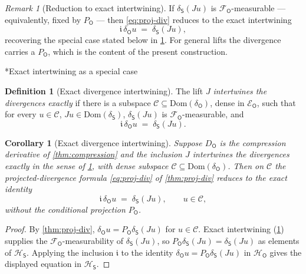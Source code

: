 \documentclass[11pt,reqno]{amsart}
\makeatletter
\renewcommand\subsection{\@startsection{subsection}{2}%
  \z@{.7\linespacing}{.5\linespacing}%
  {\normalfont\centering\scshape}}
\theoremstyle{plain}
\newtheorem{corollary}[theorem]{Corollary}
\theoremstyle{definition}
\newtheorem{definition}[theorem]{Definition}
\theoremstyle{remark}
\newtheorem{remark}[theorem]{Remark}
\newcommand{\Hilb}{\mathcal{H}}
\newcommand{\Dom}{\mathrm{Dom}}
\newcommand{\Energy}{\mathcal{E}}
\newcommand{\Source}{\mathsf{S}}
\newcommand{\Obs}{\mathsf{O}}
\renewcommand{\iota}{\mathfrak{i}}
\makeatother
\begin{document}
\begin{remark}[Reduction to exact intertwining]\label{rem:exact-special}
If $\delta_\Source(Ju)$ is $\mathcal F_\Obs$-measurable --- equivalently,
fixed by $P_\Obs$ --- then \cref{eq:proj-div} reduces to the exact
intertwining
\[
  \iota\,\delta_\Obs u \;=\; \delta_\Source(Ju),
\]
recovering the special case stated below in
\cref{cor:exact-intertwining}. For general lifts the divergence carries
a $P_\Obs$, which is the content of the present construction.
\end{remark}

\subsection*{Exact intertwining as a special case}

\begin{definition}[Exact divergence intertwining]\label{def:dintertwine}
The lift $J$ \emph{intertwines the divergences exactly} if there is a
subspace $\mathcal C\subseteq\Dom(\delta_\Obs)$, dense in $\Energy_\Obs$,
such that for every $u\in\mathcal C$, $Ju\in\Dom(\delta_\Source)$,
$\delta_\Source(Ju)$ is $\mathcal F_\Obs$-measurable, and
\[
  \iota\,\delta_\Obs u \;=\; \delta_\Source(Ju).
\]
\end{definition}

\begin{corollary}[Exact divergence intertwining]\label{cor:exact-intertwining}
Suppose $D_\Obs$ is the compression derivative of
\cref{thm:compression} and the inclusion $J$ intertwines the
divergences exactly in the sense of \cref{def:dintertwine}, with dense
subspace $\mathcal C\subseteq\Dom(\delta_\Obs)$. Then on $\mathcal C$
the projected-divergence formula \eqref{eq:proj-div} of
\cref{thm:proj-div} reduces to the exact identity
\[
  \iota\,\delta_\Obs u \;=\; \delta_\Source(Ju),\qquad u\in\mathcal C,
\]
without the conditional projection $P_\Obs$.
\end{corollary}

\begin{proof}
By \cref{thm:proj-div}, $\delta_\Obs u = P_\Obs\delta_\Source(Ju)$ for
$u\in\mathcal C$. Exact intertwining (\cref{def:dintertwine}) supplies
the $\mathcal F_\Obs$-measurability of $\delta_\Source(Ju)$, so
$P_\Obs\delta_\Source(Ju)=\delta_\Source(Ju)$ as elements of
$\Hilb_\Source$. Applying the inclusion $\iota$ to the identity
$\delta_\Obs u=P_\Obs\delta_\Source(Ju)$ in $\Hilb_\Obs$ gives the
displayed equation in $\Hilb_\Source$.
\end{proof}
\end{document}
